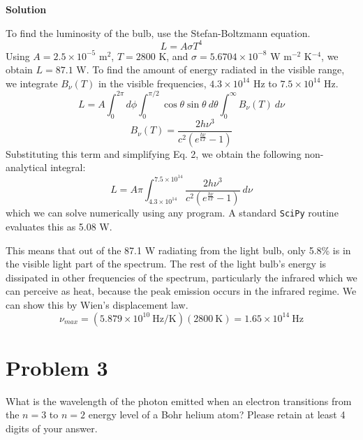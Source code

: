 \documentclass[12pt]{article}
\begin{document}
\setcounter{equation}{0}
\vspace{0.5cm}
\begin{adjustwidth}{2.5em}{0pt}
\begin{siderules}
 {\color{cyan} \textbf{Solution}
 
To find the luminosity of the bulb, use the Stefan-Boltzmann equation.
\begin{equation}
L = A\sigma T^4
\end{equation}
Using $A = 2.5 \times 10^{-5}$ m$^2$, $T = 2800$ K, and $\sigma = 5.6704 \times 10^{-8}$ W m$^{-2}$ K$^{-4}$, we obtain $L = 87.1$ W.
To find the amount of energy radiated in the visible range, we integrate $B_{\nu}(T)$ in the visible frequencies, $4.3 \times 10^{14}$ Hz to $7.5 \times 10^{14}$ Hz.
\begin{equation}
L = A \int_{0}^{2\pi} d\phi \int_{0}^{\pi/2} \cos \theta \sin \theta ~d\theta \int_{0}^{\infty} B_{\nu}(T) ~d\nu
\end{equation}
\begin{equation}
B_{\nu}(T) = \frac{2h\nu^3}{c^2\left(e^{\frac{h\nu}{kT}}-1 \right)}
\end{equation}
Substituting this term and simplifying Eq. 2, we obtain the following non-analytical integral:
\begin{equation}
L = A\pi \int_{4.3\times 10^{14}}^{7.5\times 10^{14}} \frac{2h\nu^3}{c^2\left(e^{\frac{h\nu}{kT}}-1 \right)} ~d\nu
\end{equation}
which we can solve numerically using any program. A standard \texttt{SciPy} routine evaluates this as 5.08 W.

This means that out of the 87.1 W radiating from the light bulb, only 5.8\% is in the visible light part of the spectrum. The rest of the light bulb's energy is dissipated in other frequencies of the spectrum, particularly the infrared which we can perceive as heat, because the peak emission occurs in the infrared regime. We can show this by Wien's displacement law.
\begin{equation}
\nu_{max} = (5.879 \times 10^{10} ~\text{Hz/K})(2800 ~\text{K}) = 1.65 \times 10^{14} ~\text{Hz}
\end{equation}
 }
\end{siderules}
\end{adjustwidth}

\section*{Problem 3}
What is the wavelength of the photon emitted when an electron transitions from the $n = 3$ to $n = 2$ energy level of a Bohr helium atom? Please retain at least 4 digits of your answer.
\end{document}

